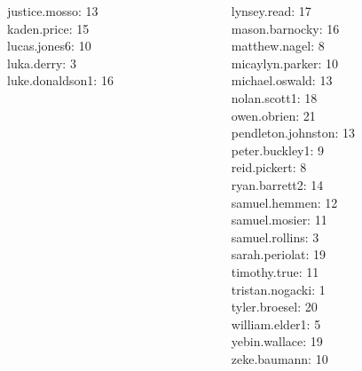 \documentclass[10pt]{beamer}
\begin{document}
\begin{frame}
\begin{columns}
\begin{column}{0.33\textwidth}
justice.mosso: 13 \\ 
kaden.price: 15 \\ 
lucas.jones6: 10 \\ 
luka.derry: 3 \\ 
luke.donaldson1: 16 \\\end{column}
\begin{column}{0.33\textwidth}
lynsey.read: 17 \\ 
mason.barnocky: 16 \\ 
matthew.nagel: 8 \\ 
micaylyn.parker: 10 \\ 
michael.oswald: 13 \\ 
nolan.scott1: 18 \\ 
owen.obrien: 21 \\ 
pendleton.johnston: 13 \\ 
peter.buckley1: 9 \\ 
reid.pickert: 8 \\ 
ryan.barrett2: 14 \\ 
samuel.hemmen: 12 \\ 
samuel.mosier: 11 \\ 
samuel.rollins: 3 \\ 
sarah.periolat: 19 \\ 
timothy.true: 11 \\ 
tristan.nogacki: 1 \\ 
tyler.broesel: 20 \\ 
william.elder1: 5 \\ 
yebin.wallace: 19 \\ 
zeke.baumann: 10 \\\end{column}
\end{columns}
\vfill
\end{frame}
\end{document}
